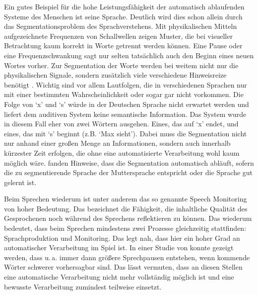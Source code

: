 \documentclass[doc,a4paper,12pt]{apa6}
\begin{document}
Ein gutes Beispiel für die hohe Leistungsfähigkeit der automatisch ablaufenden Systeme des Menschen ist seine Sprache. Deutlich wird dies schon allein durch das Segmentationsproblem des Sprachverstehens. Mit physikalischen Mitteln aufgezeichnete Frequenzen von Schallwellen zeigen Muster, die bei visueller Betrachtung kaum korrekt in Worte getrennt werden können. Eine Pause oder eine Frequenzschwankung sagt nur selten tatsächlich auch den Beginn eines neuen Wortes vorher. Zur Segmentation der Worte werden bei weitem nicht nur die physikalischen Signale, sondern zusätzlich viele verschiedene Hinweisreize benötigt \parencites[u.a.][]{brent1996distributional}{saffran1996word}. Wichtig sind vor allem Lautfolgen, die in verschiedenen Sprachen nur mit einer bestimmten Wahrscheinlichkeit oder sogar gar nicht vorkommen. Die Folge von `x' und `s' würde in der Deutschen Sprache nicht erwartet werden und liefert dem auditiven System keine semantische Information. Das System wurde in diesem Fall eher von zwei Wörtern ausgehen. Eines, das auf `x' endet, und eines, das mit `s' beginnt (z.B. `Max sieht'). Dabei muss die Segmentation nicht nur anhand einer großen Menge an Informationen, sondern auch innerhalb kürzester Zeit erfolgen, die ohne eine automatisierte Verarbeitung wohl kaum möglich wäre. \textcite{sanders2002segmenting} fanden Hinweise, dass die Segmentation automatisch abläuft, sofern die zu segmentierende Sprache der Muttersprache entspricht oder die Sprache gut gelernt ist.

Beim Sprechen wiederum ist unter anderem das so genannte Speech Monitoring \parencites{levelt1983monitoring}{postma2000detection} von hoher Bedeutung. Das bezeichnet die Fähigkeit, die inhaltliche Qualität des Gesprochenen noch während des Sprechens reflektieren zu können. Das wiederum bedeutet, dass beim Sprechen mindestens zwei Prozesse gleichzeitig stattfinden: Sprachproduktion und Monitoring. Das legt nah, dass hier ein hoher Grad an automatischer Verarbeitung im Spiel ist. In einer Studie von \textcite{goldman1958speech} konnte gezeigt werden, dass u.\,a. immer dann größere Sprechpausen entstehen, wenn kommende Wörter schwerer vorhersagbar sind. Das lässt vermuten, dass an diesen Stellen eine automatische Verarbeitung nicht mehr vollständig möglich ist und eine bewusste Verarbeitung zumindest teilweise einsetzt.
\end{document}
